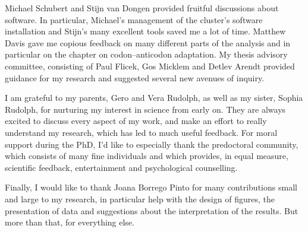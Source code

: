 Michael Schubert and Stĳn van Dongen provided fruitful discussions about
software. In particular, Michael’s management of the cluster’s software
installation and Stĳn’s many excellent tools saved me a lot of time. Matthew
Davis gave me copious feedback on many different parts of the analysis and in
particular on the chapter on codon--anticodon adaptation. My thesis advisory
committee, consisting of Paul Flicek, Gos Micklem and Detlev Arendt provided
guidance for my research and suggested several new avenues of inquiry.

I am grateful to my parents, Gero and Vera Rudolph, as well as my sister, Sophia
Rudolph, for nurturing my interest in science from early on. They are always
excited to discuss every aspect of my work, and make an effort to really
understand my research, which has led to much useful feedback. For moral support
during the PhD, I’d like to especially thank the  predoctoral
community, which consists of many fine individuals and which provides, in equal
measure, scientific feedback, entertainment and psychological counselling.

Finally, I would like to thank Joana Borrego Pinto for many contributions small
and large to my research, in particular help with the design of figures, the
presentation of data and suggestions about the interpretation of the results.
But more than that, for everything else.

